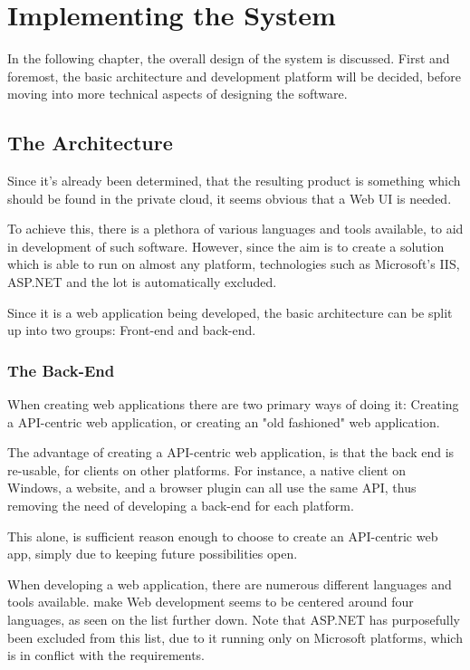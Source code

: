 \chapter{Implementing the System}

	In the following chapter, the overall design of the system is discussed. First and foremost, the basic architecture and development platform will be decided, before moving into more technical aspects of designing the software.


	\section{The Architecture}
		Since it's already been determined, that the resulting product is something which should be found in the private cloud, it seems obvious that a Web UI is needed.

		To achieve this, there is a plethora of various languages and tools available, to aid in development of such software. However, since the aim is to create a solution which is able to run on almost any platform, technologies such as Microsoft's IIS, ASP.NET and the lot is automatically excluded.



		Since it is a web application being developed, the basic architecture can be split up into two groups: Front-end and back-end.

		\subsection{The Back-End}
			When creating web applications there are two primary ways of doing it: Creating a API-centric web application, or creating an "old fashioned" web application.

			The advantage of creating a API-centric web application, is that the back end is re-usable, for clients on other platforms. For instance, a native client on Windows, a website, and a browser plugin can all use the same API, thus removing the need of developing a back-end for each platform.

			This alone, is sufficient reason enough to choose to create an API-centric web app, simply due to keeping future possibilities open.

			When developing a web application, there are numerous different languages and tools available. make
			Web development seems to be centered around four languages, as seen on the list further down. Note that ASP.NET has purposefully been excluded from this list, due to it running only on Microsoft platforms, which is in conflict with the requirements.
			
